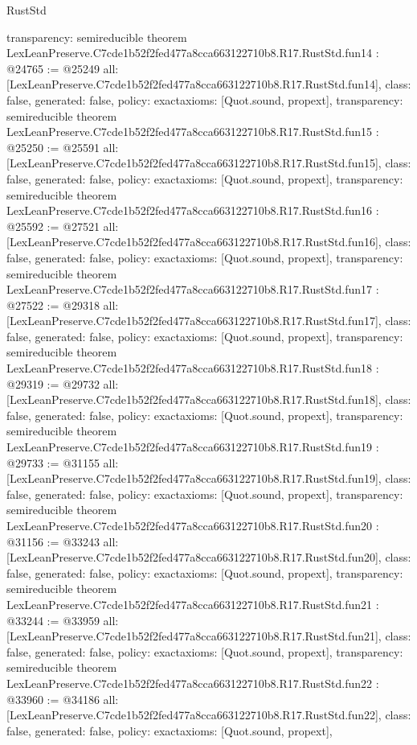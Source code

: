 \begin{lexlean}{RustStd}
\begin{coremodule}
{  transparency: semireducible
}
theorem LexLeanPreserve.C7cde1b52f2fed477a8cca663122710b8.R17.RustStd.fun14 : @24765 := @25249 {
  all: [LexLeanPreserve.C7cde1b52f2fed477a8cca663122710b8.R17.RustStd.fun14],
  class: false,
  generated: false,
  policy: exact{axioms: [Quot.sound, propext]},
  transparency: semireducible
}
theorem LexLeanPreserve.C7cde1b52f2fed477a8cca663122710b8.R17.RustStd.fun15 : @25250 := @25591 {
  all: [LexLeanPreserve.C7cde1b52f2fed477a8cca663122710b8.R17.RustStd.fun15],
  class: false,
  generated: false,
  policy: exact{axioms: [Quot.sound, propext]},
  transparency: semireducible
}
theorem LexLeanPreserve.C7cde1b52f2fed477a8cca663122710b8.R17.RustStd.fun16 : @25592 := @27521 {
  all: [LexLeanPreserve.C7cde1b52f2fed477a8cca663122710b8.R17.RustStd.fun16],
  class: false,
  generated: false,
  policy: exact{axioms: [Quot.sound, propext]},
  transparency: semireducible
}
theorem LexLeanPreserve.C7cde1b52f2fed477a8cca663122710b8.R17.RustStd.fun17 : @27522 := @29318 {
  all: [LexLeanPreserve.C7cde1b52f2fed477a8cca663122710b8.R17.RustStd.fun17],
  class: false,
  generated: false,
  policy: exact{axioms: [Quot.sound, propext]},
  transparency: semireducible
}
theorem LexLeanPreserve.C7cde1b52f2fed477a8cca663122710b8.R17.RustStd.fun18 : @29319 := @29732 {
  all: [LexLeanPreserve.C7cde1b52f2fed477a8cca663122710b8.R17.RustStd.fun18],
  class: false,
  generated: false,
  policy: exact{axioms: [Quot.sound, propext]},
  transparency: semireducible
}
theorem LexLeanPreserve.C7cde1b52f2fed477a8cca663122710b8.R17.RustStd.fun19 : @29733 := @31155 {
  all: [LexLeanPreserve.C7cde1b52f2fed477a8cca663122710b8.R17.RustStd.fun19],
  class: false,
  generated: false,
  policy: exact{axioms: [Quot.sound, propext]},
  transparency: semireducible
}
theorem LexLeanPreserve.C7cde1b52f2fed477a8cca663122710b8.R17.RustStd.fun20 : @31156 := @33243 {
  all: [LexLeanPreserve.C7cde1b52f2fed477a8cca663122710b8.R17.RustStd.fun20],
  class: false,
  generated: false,
  policy: exact{axioms: [Quot.sound, propext]},
  transparency: semireducible
}
theorem LexLeanPreserve.C7cde1b52f2fed477a8cca663122710b8.R17.RustStd.fun21 : @33244 := @33959 {
  all: [LexLeanPreserve.C7cde1b52f2fed477a8cca663122710b8.R17.RustStd.fun21],
  class: false,
  generated: false,
  policy: exact{axioms: [Quot.sound, propext]},
  transparency: semireducible
}
theorem LexLeanPreserve.C7cde1b52f2fed477a8cca663122710b8.R17.RustStd.fun22 : @33960 := @34186 {
  all: [LexLeanPreserve.C7cde1b52f2fed477a8cca663122710b8.R17.RustStd.fun22],
  class: false,
  generated: false,
  policy: exact{axioms: [Quot.sound, propext]},
}
\end{coremodule}
\end{lexlean}
